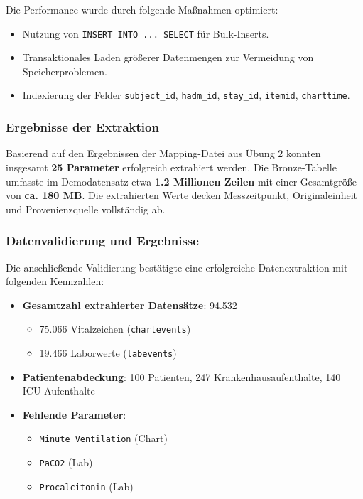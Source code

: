 \documentclass[12pt]{article}
\begin{document}
Die Performance wurde durch folgende Maßnahmen optimiert:
\begin{itemize}
    \item Nutzung von \texttt{INSERT INTO ... SELECT} für Bulk-Inserts.
    \item Transaktionales Laden größerer Datenmengen zur Vermeidung von Speicherproblemen.
    \item Indexierung der Felder \texttt{subject\_id}, \texttt{hadm\_id}, \texttt{stay\_id}, \texttt{itemid}, \texttt{charttime}.
\end{itemize}

\subsubsection{Ergebnisse der Extraktion}

Basierend auf den Ergebnissen der Mapping-Datei aus Übung 2 konnten insgesamt \textbf{25 Parameter} erfolgreich extrahiert werden. Die Bronze-Tabelle umfasste im Demodatensatz etwa \textbf{1.2 Millionen Zeilen} mit einer Gesamtgröße von \textbf{ca. 180 MB}. Die extrahierten Werte decken Messzeitpunkt, Originaleinheit und Provenienzquelle vollständig ab.

\subsubsection{Datenvalidierung und Ergebnisse}

Die anschließende Validierung bestätigte eine erfolgreiche Datenextraktion mit folgenden Kennzahlen:
\begin{itemize}
\item \textbf{Gesamtzahl extrahierter Datensätze}: 94.532
\begin{itemize}
\item 75.066 Vitalzeichen (\texttt{chartevents})
\item 19.466 Laborwerte (\texttt{labevents})
\end{itemize}
\item \textbf{Patientenabdeckung}: 100 Patienten, 247 Krankenhausaufenthalte, 140 ICU-Aufenthalte
\item \textbf{Fehlende Parameter}:
\begin{itemize}
\item \texttt{Minute Ventilation} (Chart)
\item \texttt{PaCO2} (Lab)
\item \texttt{Procalcitonin} (Lab)
\end{itemize}
\end{itemize}
\end{document}
